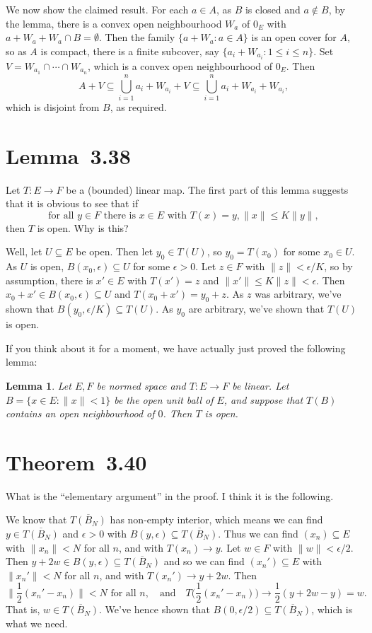 \documentclass[twoside,12pt,a4paper]{article}
\theoremstyle{plain}
\newtheorem{lemma}[proposition]{Lemma}
\theoremstyle{definition}
\begin{document}
We now show the claimed result.  For each $a\in A$, as $B$ is closed
and $a\not\in B$, by the lemma, there is a convex open neighbourhood $W_a$
of $0_E$ with $a+W_a+W_a \cap B = \emptyset$.  Then the family
$\{ a+W_a : a\in A \}$ is an open cover for $A$, so as $A$ is
compact, there is a finite subcover, say $\{ a_i+W_{a_i} : 1\leq i\leq n\}$.
Set $V=W_{a_1} \cap\cdots\cap W_{a_n}$, which is a convex open neighbourhood
of $0_E$.  Then
\[ A+V \subseteq \bigcup_{i=1}^n a_i + W_{a_i} + V
\subseteq \bigcup_{i=1}^n a_i + W_{a_i} + W_{a_i}, \]
which is disjoint from $B$, as required.



\section{Lemma~3.38}

Let $T:E\rightarrow F$ be a (bounded) linear map.
The first part of this lemma suggests that it is obvious to see that if
\[ \text{for all } y\in F \text{ there is }x\in E \text{ with }
T(x)=y, \|x\|\leq K\|y\|, \]
then $T$ is open.  Why is this?

Well, let $U\subseteq E$ be open.  Then let $y_0\in T(U)$, so $y_0=T(x_0)$ for some
$x_0\in U$.  As $U$ is open, $B(x_0,\epsilon)\subseteq U$ for some $\epsilon>0$.
Let $z\in F$ with $\|z\| < \epsilon/K$, so by assumption, there is $x'\in E$ with
$T(x')=z$ and $\|x'\|\leq K\|z\|<\epsilon$.  Then $x_0+x' \in B(x_0,\epsilon)\subseteq U$
and $T(x_0+x') = y_0+z$.  As $z$ was arbitrary, we've shown that $B(y_0,\epsilon/K)
\subseteq T(U)$.  As $y_0$ are arbitrary, we've shown that $T(U)$ is open.

If you think about it for a moment, we have actually just proved the following lemma:

\begin{lemma}
Let $E,F$ be normed space and $T:E\rightarrow F$ be linear.  Let $B=\{x\in E:
\|x\|<1\}$ be the open unit ball of $E$, and suppose that $T(B)$ contains an open
neighbourhood of $0$.  Then $T$ is open.
\end{lemma}




\section{Theorem~3.40}

What is the ``elementary argument'' in the proof.  I think it is the following.

We know that $\overline{T(B_N)}$ has non-empty interior, which means we can find
$y\in \overline{T(B_N)}$ and $\epsilon>0$ with $B(y,\epsilon) \subseteq 
\overline{T(B_N)}$.  Thus we can find $(x_n)\subseteq E$ with $\|x_n\|< N$ for all
$n$, and with
$T(x_n)\rightarrow y$.  Let $w\in F$ with $\|w\| < \epsilon/2$.  Then
$y+2w \in B(y,\epsilon) \subseteq \overline{T(B_N)}$ and so we can find 
$(x_n')\subseteq E$ with $\|x_n'\|<N$ for all $n$,
and with $T(x_n')\rightarrow y+2w$.  Then
\[ \Big\| \frac{1}{2}(x_n'-x_n) \Big\| < N \text{ for all }n, \quad
\text{and}\quad T\Big( \frac{1}{2}(x_n'-x_n) \Big)
\rightarrow \frac12(y+2w - y) = w. \]
That is, $w\in \overline{T(B_N)}$.  We've hence shown that $B(0,\epsilon/2)
\subseteq \overline{T(B_N)}$, which is what we need.
\end{document}
